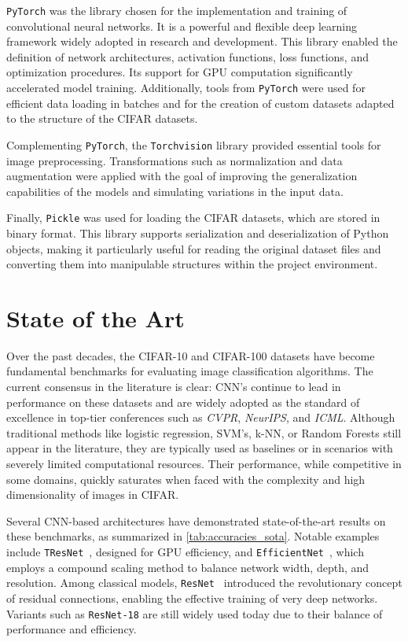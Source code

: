 \documentclass[journal,article,submit,pdftex,moreauthors]{Definitions/mdpi}
\begin{document}
\texttt{PyTorch} was the library chosen for the implementation and training of convolutional neural networks. It is a powerful and flexible deep learning framework widely adopted in research and development. This library enabled the definition of network architectures, activation functions, loss functions, and optimization procedures. Its support for GPU computation significantly accelerated model training. Additionally, tools from \texttt{PyTorch} were used for efficient data loading in batches and for the creation of custom datasets adapted to the structure of the CIFAR datasets.

Complementing \texttt{PyTorch}, the \texttt{Torchvision} library provided essential tools for image preprocessing. Transformations such as normalization and data augmentation were applied with the goal of improving the generalization capabilities of the models and simulating variations in the input data.

Finally, \texttt{Pickle} was used for loading the CIFAR datasets, which are stored in binary format. This library supports serialization and deserialization of Python objects, making it particularly useful for reading the original dataset files and converting them into manipulable structures within the project environment.

\section{State of the Art}

Over the past decades, the CIFAR-10 and CIFAR-100 datasets have become fundamental benchmarks for evaluating image classification algorithms. The current consensus in the literature is clear: CNN's continue to lead in performance on these datasets and are widely adopted as the standard of excellence in top-tier conferences such as \textit{CVPR}, \textit{NeurIPS}, and \textit{ICML}. Although traditional methods like logistic regression, SVM's, k-NN, or Random Forests still appear in the literature, they are typically used as baselines or in scenarios with severely limited computational resources. Their performance, while competitive in some domains, quickly saturates when faced with the complexity and high dimensionality of images in CIFAR.

Several CNN-based architectures have demonstrated state-of-the-art results on these benchmarks, as summarized in \autoref{tab:accuracies_sota}. Notable examples include \texttt{TResNet}~\cite{tresnet}, designed for GPU efficiency, and \texttt{EfficientNet}~\cite{efficientnet}, which employs a compound scaling method to balance network width, depth, and resolution. Among classical models, \texttt{ResNet~\cite{resnet}} introduced the revolutionary concept of residual connections, enabling the effective training of very deep networks. Variants such as \texttt{ResNet-18} are still widely used today due to their balance of performance and efficiency.
\end{document}

